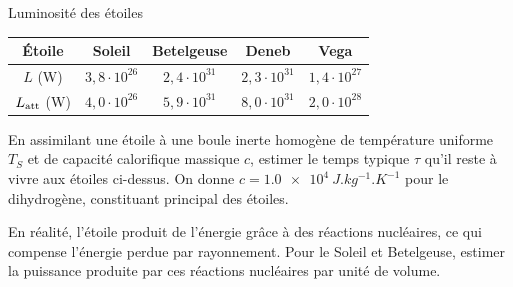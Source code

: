 \begin{exo}[PC][1][colle]{Luminosité des étoiles}
\begin{quest}
{  \begin{center}
  \begin{tabular}{|c|c|c|c|c|}
  \hline
  Étoile & Soleil & Betelgeuse & Deneb & Vega \\
  \hline
   $L$ (W) & $3,8 \cdot 10^{26}$ & $2,4 \cdot 10^{31}$ & $2,3 \cdot 10^{31}$ & $1,4 \cdot 10^{27}$\\
  \hline
  $L_{\rm att}$ (W) & $4,0 \cdot 10^{26}$ & $5,9 \cdot 10^{31}$ & $8,0 \cdot 10^{31}$ & $2,0 \cdot 10^{28}$\\
  \hline
  \end{tabular}
  \end{center}
  } %
	\item En assimilant une étoile à une boule inerte homogène de température uniforme $T_S$ et de capacité calorifique massique $c$, estimer le temps typique $\tau$ qu'il reste à vivre aux étoiles ci-dessus. On donne $c= \SI{1.0e4}{J.kg^{-1}.K^{-1}}$ pour le dihydrogène, constituant principal des étoiles.
	\item En réalité, l'étoile produit de l'énergie grâce à des réactions nucléaires, ce qui compense l'énergie perdue par rayonnement. Pour le Soleil et Betelgeuse, estimer la puissance produite par ces réactions nucléaires par unité de volume.
\end{quest}
\end{exo}

